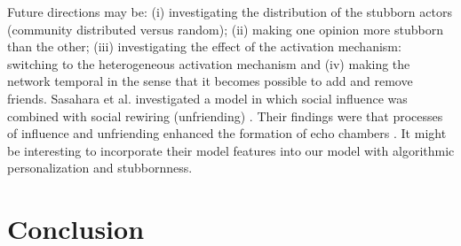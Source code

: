\documentclass[11 pt , letterpaper , twoside , openright]{book}
\begin{document}
\newline
Future directions may be: (i) investigating the distribution of the stubborn actors (community distributed versus random); (ii) making one opinion more stubborn than the other; (iii) investigating the effect of the activation mechanism: switching to the heterogeneous activation mechanism and (iv) making the network temporal in the sense that it becomes possible to add and remove friends. Sasahara et al. investigated a model in which social influence was combined with social rewiring (unfriending) \cite{Sasahara2020}. Their findings were that processes of influence and unfriending enhanced the formation of echo chambers \cite{Sasahara2020}. It might be interesting to incorporate their model features into our model with algorithmic personalization and stubbornness. 

\chapter{Conclusion}
\end{document}
